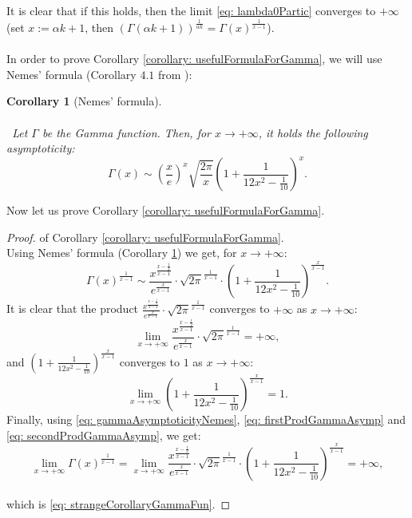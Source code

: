\documentclass[a4paper,italian,11pt]{book}
\theoremstyle{plain}
\theoremstyle{remark}
\theoremstyle{plain}
\newtheorem{corollary}{Corollary}
\begin{document}
It is clear that if this holds, then the limit \eqref{eq: lambda0Partic} converges to $+\infty$ (set $x:=\alpha k + 1$, then $\left( \Gamma(\alpha k+1)  \right)^{\frac{1}{\alpha k}} = \Gamma(x) ^{\frac{1}{x-1}} $).
\\
\\
In order to prove Corollary \ref{corollary: usefulFormulaForGamma}, we will use Nemes' formula (Corollary $4.1$ from \cite{nemesGamma}):
\begin{corollary}[Nemes' formula]
\label{corollary: nemesFormula}
\\\
\\\
Let $\Gamma$ be the Gamma function. Then, for $x\to +\infty$, it holds the following asymptoticity:
\begin{equation}
    \Gamma(x) \sim \left( \frac{x}{e} \right)^x \sqrt{\frac{2\pi}{x}} \left( 1+ \frac{1}{12x^2-\frac{1}{10}}\right)^x.
\end{equation}
\end{corollary}


\noindent
Now let us prove Corollary \ref{corollary: usefulFormulaForGamma}.
\begin{proof} of Corollary \ref{corollary: usefulFormulaForGamma}.
\\
\noindent 
Using Nemes' formula (Corollary \ref{corollary: nemesFormula}) we get, for $x\to +\infty$:
\begin{equation}
\label{eq: gammaAsymptoticityNemes}
    \Gamma(x) ^ {\frac{1}{x-1}} \sim \frac{x^{\frac{x-\frac{1}{2}}{x-1} }}{e^{\frac{x}{x-1}}} \cdot \sqrt{2 \pi}^{\frac{1}{x-1}} \cdot \left( 1+ \frac{1}{12x^2 - \frac{1}{10}} \right)^{\frac{x}{x-1}}.
\end{equation}
\noindent
It is clear that the product $ \frac{x^{\frac{x-\frac{1}{2}}{x-1} }}{e^{\frac{x}{x-1}}} \cdot \sqrt{2 \pi}^{\frac{1}{x-1}}$ converges to $+\infty$ as $x\to +\infty$:
\begin{equation}
\label{eq: firstProdGammaAsymp}
    \lim_{x \to +\infty} \frac{x^{\frac{x-\frac{1}{2}}{x-1} }}{e^{\frac{x}{x-1}}} \cdot \sqrt{2 \pi}^{\frac{1}{x-1}} = +\infty,
\end{equation}
\noindent
and $\left( 1+ \frac{1}{12x^2 - \frac{1}{10}} \right)^{\frac{x}{x-1}}$ converges to $1$ as $x\to +\infty$:
\begin{equation}
\label{eq: secondProdGammaAsymp}
    \lim_{x\to +\infty} \left( 1+ \frac{1}{12x^2 - \frac{1}{10}} \right)^{\frac{x}{x-1}} = 1.
\end{equation}
\noindent
Finally, using \eqref{eq: gammaAsymptoticityNemes}, \eqref{eq: firstProdGammaAsymp} and \eqref{eq: secondProdGammaAsymp}, we get:
$$
    \lim_{x\to +\infty} \Gamma(x) ^{\frac{1}{x-1}} = \lim_{x \to +\infty} \frac{x^{\frac{x-\frac{1}{2}}{x-1} }}{e^{\frac{x}{x-1}}} \cdot \sqrt{2 \pi}^{\frac{1}{x-1}} \cdot \left( 1+ \frac{1}{12x^2 - \frac{1}{10}} \right)^{\frac{x}{x-1}} = +\infty,
$$
\\
\noindent
which is \eqref{eq: strangeCorollaryGammaFun}. 
\end{proof}
\end{document}

